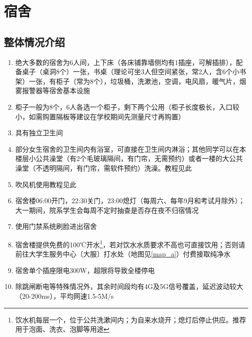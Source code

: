 \chapter[宿舍]{宿舍}
\section[整体情况介绍]{整体情况介绍}
\begin{enumerate}
    \item 绝大多数的宿舍为6人间，上下床（各床铺靠墙侧均有1插座，可解插排），配备桌子（桌洞8个）一张，书桌（理论可坐3人但空间紧张，常2人，含6个小书架）一张，有柜子（常为8个），垃圾桶，洗漱池，空调，电风扇，暖气片，烟雾报警器等宿舍基本设施
    \item 柜子一般为8个，6人各选一个柜子，剩下两个公用（柜子长度极长，入口较小，如需购置隔板等建议在学校期间先测量尺寸再购置）
    \item 具有独立卫生间
    \item 部分女生宿舍的卫生间内有浴室，可直接在卫生间内淋浴；其他同学可以在本楼层小公共澡堂（有2个毛玻璃隔间，有门帘，无需预约）或者一楼的大公共澡堂（不透明隔间，有门帘，需软件预约）洗澡。教程见此
    \item 吹风机使用教程见此
    \item 宿舍楼06:00开门，22:30关门，23:00熄灯（每周六、每年9月和考试月除外）；大一期间，院系学生会每周不定时抽查是否存在夜不归宿情况
    \item 使用门禁系统刷脸进出宿舍
    \item 宿舍楼提供免费的100℃开水\footnote{饮水机每层一个，位于公共洗漱间内；为自来水烧开；熄灯后停止供应。推荐用于泡面、洗衣、泡脚等用途}，若对饮水水质要求不高也可直接饮用；否则请前往大学生服务中心〔大服〕打水处（地图见\ref{map_a}）付费接取纯净水
    \item 宿舍单个插座限电300W，超限将导致全楼停电
    \item 除跳闸断电等特殊情况外，其余时间段均有4G及5G信号覆盖，延迟波动较大（20-200ms），平均网速1.5-5M/s
\end{enumerate}

